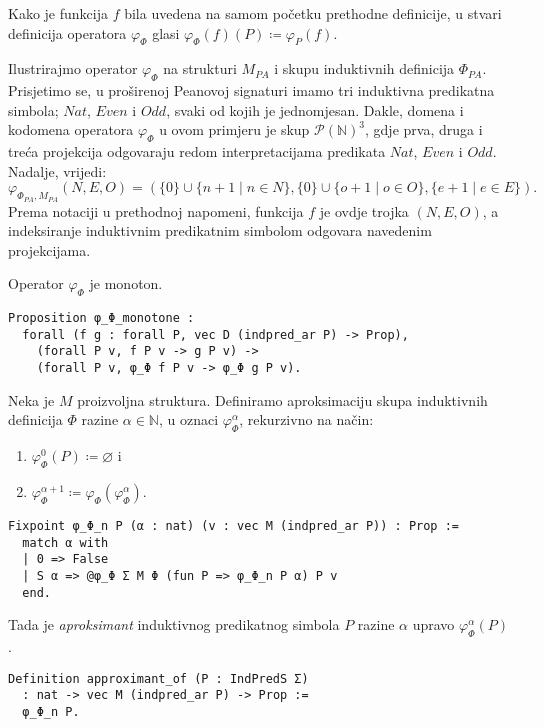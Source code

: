 \begin{remark}\label{remark:phi-phi-notation}
  Kako je funkcija \(f\) bila uvedena na samom početku prethodne definicije,
  u stvari definicija operatora \(\varphi_{\Phi}\) glasi
  \(
    \varphi_{\Phi}(f)(P) \coloneq \varphi_{P}(f)
  \).
\end{remark}

\begin{example}\label{ex:operator-phi-phi-PA}
  Ilustrirajmo operator \(\varphi_{\Phi}\) na strukturi \(M_{\mathit{PA}}\) i
  skupu induktivnih definicija \(\Phi_{\mathit{PA}}\).
  Prisjetimo se, u proširenoj Peanovoj signaturi imamo tri induktivna predikatna simbola;
  \(\mathit{Nat}\), \(\mathit{Even}\) i \(\mathit{Odd}\), svaki od kojih je jednomjesan.
  Dakle, domena i kodomena operatora \(\varphi_{\Phi}\) u ovom primjeru je skup \(\mathcal{P(\mathbb{N})}^{3}\),
  gdje prva, druga i treća projekcija odgovaraju redom interpretacijama predikata
  \(\mathit{Nat}\), \(\mathit{Even}\) i \(\mathit{Odd}\). Nadalje, vrijedi:
  \[
    \varphi_{\Phi_{\mathit{PA}}, M_{\mathit{PA}}}(N, E, O) =
    ( \{ 0 \} \cup \{ n + 1 \mid n \in N \},
    \{ 0 \} \cup \{ o + 1 \mid o \in O \},
    \{ e + 1 \mid e \in E \} ).
  \]
  \noindent Prema notaciji u prethodnoj napomeni,
  funkcija \(f\) je ovdje trojka \((N, E, O)\),
  a indeksiranje induktivnim predikatnim simbolom odgovara navedenim projekcijama.
\end{example}

\begin{proposition}
  Operator \(\varphi_{\Phi}\) je monoton.
\begin{verbatim}
Proposition φ_Φ_monotone :
  forall (f g : forall P, vec D (indpred_ar P) -> Prop),
    (forall P v, f P v -> g P v) ->
    (forall P v, φ_Φ f P v -> φ_Φ g P v).
\end{verbatim}
\end{proposition}

\begin{definition}
  Neka je \(M\) proizvoljna struktura.
  Definiramo aproksimaciju skupa induktivnih definicija \(\Phi\) razine \(\alpha \in \mathbb{N}\), u oznaci \(\varphi_{\Phi}^{\alpha}\), rekurzivno na način:
  \begin{enumerate}
  \item \( \varphi_{\Phi}^{0}(P) \coloneq \varnothing \) i
  \item \( \varphi_{\Phi}^{\alpha + 1} \coloneq \varphi_{\Phi}(\varphi_{\Phi}^{\alpha}) \).
  \end{enumerate}
\begin{verbatim}
Fixpoint φ_Φ_n P (α : nat) (v : vec M (indpred_ar P)) : Prop :=
  match α with
  | 0 => False
  | S α => @φ_Φ Σ M Φ (fun P => φ_Φ_n P α) P v
  end.
\end{verbatim}
  \noindent Tada je \textit{aproksimant} induktivnog predikatnog simbola \(P\) razine \(\alpha\) upravo \(\varphi_{\Phi}^{\alpha}(P)\).
\begin{verbatim}
Definition approximant_of (P : IndPredS Σ)
  : nat -> vec M (indpred_ar P) -> Prop :=
  φ_Φ_n P.
\end{verbatim}
\end{definition}

